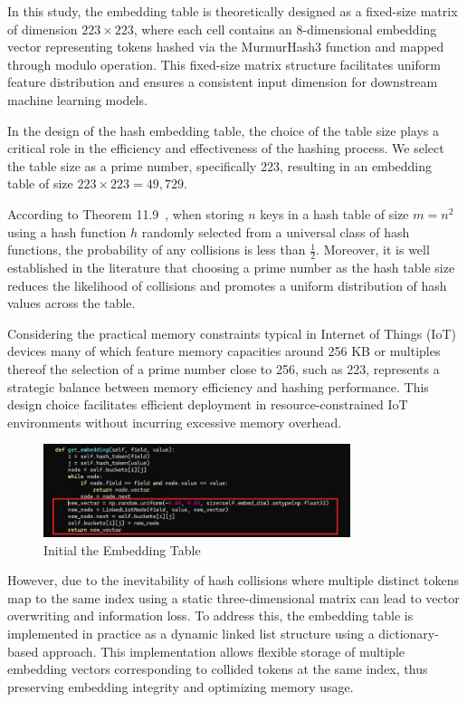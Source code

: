 \begin{ZhChapter}
    In this study, the embedding table is theoretically designed as a fixed-size matrix of dimension \(223 \times 223\), where each cell contains an 8-dimensional embedding vector representing tokens hashed via the MurmurHash3 function and mapped through modulo operation. This fixed-size matrix structure facilitates uniform feature distribution and ensures a consistent input dimension for downstream machine learning models.

    In the design of the hash embedding table, the choice of the table size plays a critical role in the efficiency and effectiveness of the hashing process. We select the table size as a prime number, specifically 223, resulting in an embedding table of size $223 \times 223 = 49,729$.

    According to Theorem 11.9~\cite{cormen2022introduction}, when storing $n$ keys in a hash table of size $m = n^2$ using a hash function $h$ randomly selected from a universal class of hash functions, the probability of any collisions is less than $\frac{1}{2}$. Moreover, it is well established in the literature that choosing a prime number as the hash table size reduces the likelihood of collisions and promotes a uniform distribution of hash values across the table.

    Considering the practical memory constraints typical in Internet of Things (IoT) devices many of which feature memory capacities around 256 KB or multiples thereof the selection of a prime number close to 256, such as 223, represents a strategic balance between memory efficiency and hashing performance. This design choice facilitates efficient deployment in resource-constrained IoT environments without incurring excessive memory overhead.

    \begin{figure}[htbp]
        \centering
        \includegraphics[width = 0.8\textwidth]{image/initial.jpg}
        \caption{Initial the Embedding Table}
        \label{fig:Initial}
    \end{figure}


    However, due to the inevitability of hash collisions where multiple distinct tokens map to the same index using a static three-dimensional matrix can lead to vector overwriting and information loss. To address this, the embedding table is implemented in practice as a dynamic linked list structure using a dictionary-based approach. This implementation allows flexible storage of multiple embedding vectors corresponding to collided tokens at the same index, thus preserving embedding integrity and optimizing memory usage.


\end{ZhChapter}
